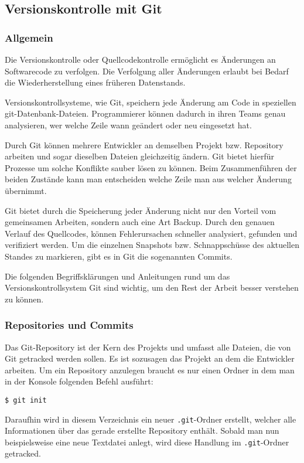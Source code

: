 \subsection{Versionskontrolle mit Git}
\subsubsection{Allgemein}
Die Versionskontrolle oder Quellcodekontrolle ermöglicht es Änderungen an
Softwarecode zu verfolgen. Die Verfolgung aller Änderungen erlaubt bei Bedarf
die Wiederherstellung eines früheren Datenstands. \parencite{git-allgemein}

Versionskontrollsysteme, wie Git, speichern jede Änderung am Code in speziellen
git-Datenbank-Dateien. Programmierer können dadurch in ihren Teams genau
analysieren, wer welche Zeile wann geändert oder neu eingesetzt hat.

Durch Git können mehrere Entwickler an demselben Projekt bzw. Repository
arbeiten und sogar dieselben Dateien gleichzeitig ändern. Git bietet hierfür
Prozesse um solche Konflikte sauber lösen zu können. Beim Zusammenführen der
beiden Zustände kann man entscheiden welche Zeile man aus welcher Änderung
übernimmt.

Git bietet durch die Speicherung jeder Änderung nicht nur den Vorteil vom
gemeinsamen Arbeiten, sondern auch eine Art \glqq Backup\grqq{}. Durch den
genauen Verlauf des Quellcodes, können Fehlerursachen schneller analysiert,
gefunden und verifiziert werden. Um die einzelnen Snapshots bzw. Schnappschüsse
des aktuellen Standes zu markieren, gibt es in Git die sogenannten Commits.

\newpage

Die folgenden Begriffsklärungen und Anleitungen rund um das
Versionskontrollsystem Git sind wichtig, um den Rest der Arbeit besser verstehen
zu können.

\subsubsection{Repositories und Commits}
Das Git-Repository ist der Kern des Projekts und umfasst alle Dateien, die von
Git getracked werden sollen. Es ist sozusagen das Projekt an dem die Entwickler
arbeiten. Um ein Repository anzulegen braucht es nur einen Ordner in dem man
in der Konsole folgenden Befehl ausführt:
\begin{lstlisting}[style=Bash]
    $ git init
\end{lstlisting}
Daraufhin wird in diesem Verzeichnis ein neuer \texttt{.git}-Ordner erstellt,
welcher alle Informationen über das gerade erstellte Repository enthält. Sobald
man nun beispielsweise eine neue Textdatei anlegt, wird diese Handlung im
\texttt{.git}-Ordner getracked.

